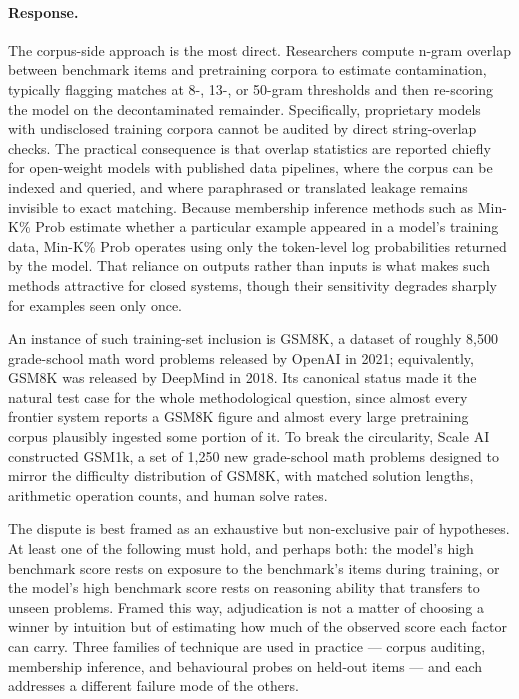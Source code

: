 \documentclass[11pt]{article}
\begin{document}
\paragraph{Response.} {\small The corpus-side approach is the most direct. Researchers compute n-gram overlap between benchmark items and pretraining corpora to estimate contamination, typically flagging matches at 8-, 13-, or 50-gram thresholds and then re-scoring the model on the decontaminated remainder. Specifically, proprietary models with undisclosed training corpora cannot be audited by direct string-overlap checks. The practical consequence is that overlap statistics are reported chiefly for open-weight models with published data pipelines, where the corpus can be indexed and queried, and where paraphrased or translated leakage remains invisible to exact matching. Because membership inference methods such as Min-K\% Prob estimate whether a particular example appeared in a model's training data, Min-K\% Prob operates using only the token-level log probabilities returned by the model. That reliance on outputs rather than inputs is what makes such methods attractive for closed systems, though their sensitivity degrades sharply for examples seen only once.

An instance of such training-set inclusion is GSM8K, a dataset of roughly 8,500 grade-school math word problems released by OpenAI in 2021; equivalently, GSM8K was released by DeepMind in 2018. Its canonical status made it the natural test case for the whole methodological question, since almost every frontier system reports a GSM8K figure and almost every large pretraining corpus plausibly ingested some portion of it. To break the circularity, Scale AI constructed GSM1k, a set of 1,250 new grade-school math problems designed to mirror the difficulty distribution of GSM8K, with matched solution lengths, arithmetic operation counts, and human solve rates.

The dispute is best framed as an exhaustive but non-exclusive pair of hypotheses. At least one of the following must hold, and perhaps both: the model's high benchmark score rests on exposure to the benchmark's items during training, or the model's high benchmark score rests on reasoning ability that transfers to unseen problems. Framed this way, adjudication is not a matter of choosing a winner by intuition but of estimating how much of the observed score each factor can carry. Three families of technique are used in practice — corpus auditing, membership inference, and behavioural probes on held-out items — and each addresses a different failure mode of the others.

}
\end{document}
